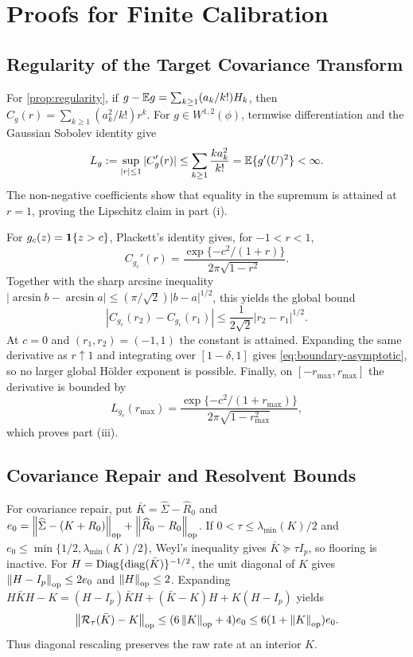 \section{Proofs for Finite Calibration}
\label{sec:app-calibration}

\subsection{Regularity of the Target Covariance Transform}

For \cref{prop:regularity}, if
$g-\mathbb{E} g=\sum_{k\ge1}(a_k/k!)H_k$, then
$C_g(r)=\sum_{k\ge1}(a_k^2/k!)r^k$. For
$g\in W^{1,2}(\phi)$, termwise differentiation and the Gaussian Sobolev
identity give
\begin{equation}
L_g:=\sup_{|r|\le1}|C_g'(r)|
\le \sum_{k\ge1}\frac{k a_k^2}{k!}
=\mathbb{E}\{g'(U)^2\}<\infty.
\label{eq:app-smooth-L}
\end{equation}
The non-negative coefficients show that equality in the supremum is attained
at $r=1$, proving the Lipschitz claim in part (i).

For $g_c(z)=\mathbf{1}\{z>c\}$, Plackett's identity gives, for $-1<r<1$,
\begin{equation*}
C_{g_c}'(r)=
\frac{\exp\{-c^2/(1+r)\}}{2\pi\sqrt{1-r^2}}.
\end{equation*}
Together with the sharp arcsine inequality
$|\arcsin b-\arcsin a|\le(\pi/\sqrt2)|b-a|^{1/2}$, this yields the global
bound
\begin{equation}
|C_{g_c}(r_2)-C_{g_c}(r_1)|
\le \frac{1}{2\sqrt2}|r_2-r_1|^{1/2}.
\label{eq:app-threshold-holder}
\end{equation}
At $c=0$ and $(r_1,r_2)=(-1,1)$ the constant is attained. Expanding the same
derivative as $r\uparrow1$ and integrating over $[1-\delta,1]$ gives
\eqref{eq:boundary-asymptotic}, so no larger global H\"older exponent is
possible. Finally, on $[-r_{\max},r_{\max}]$ the derivative is bounded by
\begin{equation}
L_{g_c}(r_{\max})=
\frac{\exp\{-c^2/(1+r_{\max})\}}
{2\pi\sqrt{1-r_{\max}^2}},
\label{eq:app-threshold-local-L}
\end{equation}
which proves part (iii).

\subsection{Covariance Repair and Resolvent Bounds}

For covariance repair, put $\bar K=\widehat\Sigma-\widehat R_0$ and
$e_0=\left\lVert \widehat\Sigma-(K+R_0) \right\rVert_{\mathrm{op}}+\left\lVert \widehat R_0-R_0 \right\rVert_{\mathrm{op}}$.
If $0<\tau\le\lambda_{\min}(K)/2$ and
$e_0\le\min\{1/2,\lambda_{\min}(K)/2\}$, Weyl's inequality gives
$\bar K\succeq\tau I_p$, so flooring is inactive. For
$H=\operatorname{Diag}\{\operatorname{diag}(\bar K)\}^{-1/2}$, the unit diagonal of $K$ gives
$\left\lVert H-I_p \right\rVert_{\mathrm{op}}\le2e_0$ and $\left\lVert H \right\rVert_{\mathrm{op}}\le2$. Expanding
$H\bar K H-K=(H-I_p)\bar K H+(\bar K-K)H+K(H-I_p)$ yields
\begin{equation}
\left\lVert \mathcal{R}_\tau(\bar K)-K \right\rVert_{\mathrm{op}}
\le(6\left\lVert K \right\rVert_{\mathrm{op}}+4)e_0
\le6(1+\left\lVert K \right\rVert_{\mathrm{op}})e_0.
\label{eq:app-repair-bound}
\end{equation}
Thus diagonal rescaling preserves the raw rate at an interior $K$.

